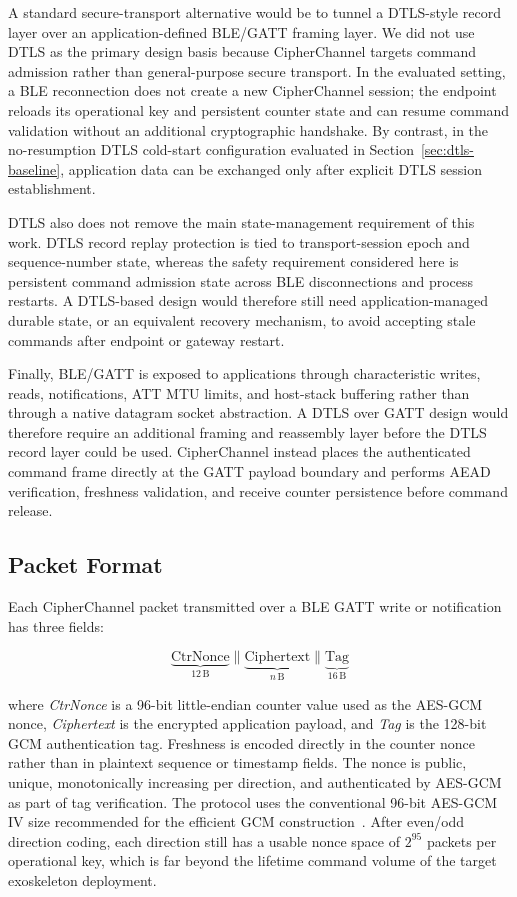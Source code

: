 \documentclass[journal]{IEEEtran}
\begin{document}
A standard secure-transport alternative would be to tunnel a DTLS-style record layer over an application-defined BLE/GATT framing layer. We did not use DTLS as the primary design basis because CipherChannel targets command admission rather than general-purpose secure transport. In the evaluated setting, a BLE reconnection does not create a new CipherChannel session; the endpoint reloads its operational key and persistent counter state and can resume command validation without an additional cryptographic handshake. By contrast, in the no-resumption DTLS cold-start configuration evaluated in Section~\ref{sec:dtls-baseline}, application data can be exchanged only after explicit DTLS session establishment.

DTLS also does not remove the main state-management requirement of this work. DTLS record replay protection is tied to transport-session epoch and sequence-number state, whereas the safety requirement considered here is persistent command admission state across BLE disconnections and process restarts. A DTLS-based design would therefore still need application-managed durable state, or an equivalent recovery mechanism, to avoid accepting stale commands after endpoint or gateway restart.

Finally, BLE/GATT is exposed to applications through characteristic writes, reads, notifications, ATT MTU limits, and host-stack buffering rather than through a native datagram socket abstraction. A DTLS over GATT design would therefore require an additional framing and reassembly layer before the DTLS record layer could be used. CipherChannel instead places the authenticated command frame directly at the GATT payload boundary and performs AEAD verification, freshness validation, and receive counter persistence before command release.

\subsection{Packet Format}
\label{sec:packetformat}

Each CipherChannel packet transmitted over a BLE GATT write or notification has
three fields:

\[
\underbrace{\text{CtrNonce}}_{12\,\text{B}} \parallel
\underbrace{\text{Ciphertext}}_{n\,\text{B}} \parallel
\underbrace{\text{Tag}}_{16\,\text{B}}
\]

\noindent where \emph{CtrNonce} is a 96-bit little-endian counter value used as the AES-GCM nonce, \emph{Ciphertext} is the encrypted application payload, and \emph{Tag} is the 128-bit GCM authentication tag. Freshness is encoded directly in the counter nonce rather than in plaintext sequence or timestamp fields. The nonce is public, unique, monotonically increasing per direction, and authenticated by AES-GCM as part of tag verification. The protocol uses the conventional 96-bit AES-GCM IV size recommended for the efficient GCM construction~\cite{nist_sp800_38d}. After even/odd direction coding, each direction still has a usable nonce space of $2^{95}$ packets per operational key, which is far beyond the lifetime command volume of the target exoskeleton deployment.
\end{document}
